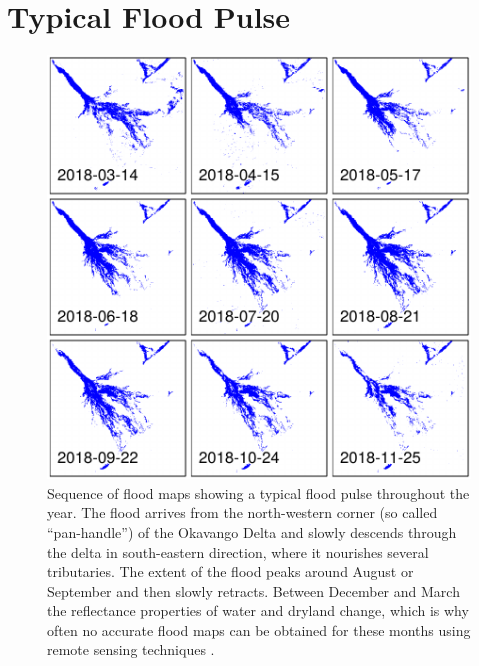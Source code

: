 \documentclass[abstract=off,10pt,a4paper,bibliography=totocnumbered]{article}
\begin{document}
\newpage
\section{Typical Flood Pulse}
\begin{figure}[hbtp]
  \begin{center}
    \includegraphics[width = \textwidth]{99_FloodPulse.pdf}
    \caption{Sequence of flood maps showing a typical flood pulse throughout the
    year. The flood arrives from the north-western corner (so called
    ``pan-handle'') of the Okavango Delta and slowly descends through the delta
    in south-eastern direction, where it nourishes several tributaries. The
    extent of the flood peaks around August or September and then slowly
    retracts. Between December and March the reflectance properties of water and
    dryland change, which is why often no accurate flood maps can be obtained
    for these months using remote sensing techniques \citep{Wolski.2017}.}
    \label{FloodPulse}
  \end{center}
\end{figure}

\newpage
\end{document}
